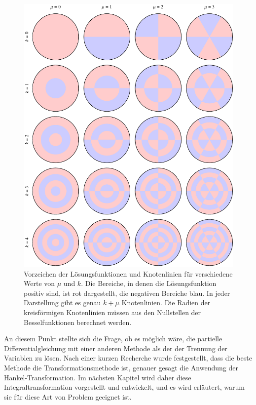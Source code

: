 \begin{figure}
	\centering
	\includegraphics[width=\textwidth]{chapters/090-pde/bessel/pauke.pdf}
	\caption{Vorzeichen der Lösungsfunktionen und Knotenlinien
		für verschiedene Werte von $\mu$ und $k$.
		Die Bereiche, in denen die Lösungsfunktion positiv sind, ist 
		rot dargestellt, die negativen Bereiche blau.
		In jeder Darstellung gibt es genau $k+\mu$ Knotenlinien.
		Die Radien der kreisförmigen Knotenlinien müssen aus den Nullstellen
		der Besselfunktionen berechnet werden.
		\label{buch:pde:kreis:fig:pauke}}
\end{figure}


An diesem Punkt stellte sich die Frage, ob es möglich wäre, die partielle Differentialgleichung mit einer anderen Methode als der der Trennung der Variablen zu lösen. Nach einer kurzen Recherche wurde festgestellt, dass die beste Methode die Transformationsmethode ist, genauer gesagt die Anwendung der Hankel-Transformation. Im nächsten Kapitel wird daher diese Integraltransformation vorgestellt und entwickelt, und es wird erläutert, warum sie für diese Art von Problem geeignet ist.
